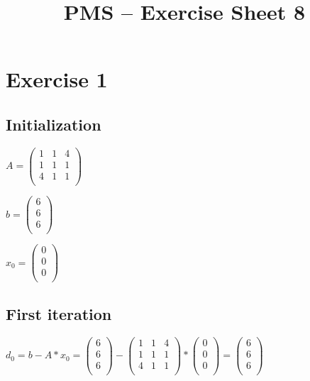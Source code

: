 \documentclass[10pt,DIV10,a4paper]{scrartcl}
\title{PMS -- Exercise Sheet 8}
\date{}
\begin{document}
\maketitle

\section*{Exercise 1}

\subsection*{Initialization}

\(A=\left(
\begin{array}{ccc}
 1 & 1 & 4 \\
 1 & 1 & 1 \\
 4 & 1 & 1 \\
\end{array}
\right)\)

\(b=\left(
\begin{array}{c}
 6 \\
 6 \\
 6 \\
\end{array}
\right)\)

\(x_0=\left(
\begin{array}{c}
 0 \\
 0 \\
 0 \\
\end{array}
\right)\)

\subsection*{First iteration}

\(d_0=b - A * x_0 = \left(
\begin{array}{c}
 6 \\
 6 \\
 6 \\
\end{array}
\right)-\left(
\begin{array}{ccc}
 1 & 1 & 4 \\
 1 & 1 & 1 \\
 4 & 1 & 1 \\
\end{array}
\right)*\left(
\begin{array}{c}
 0 \\
 0 \\
 0 \\
\end{array}
\right)=\left(
\begin{array}{c}
 6 \\
 6 \\
 6 \\
\end{array}
\right)\)
\end{document}
